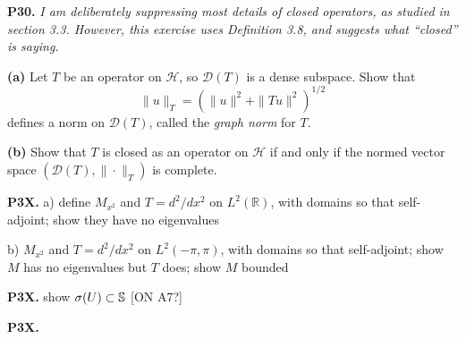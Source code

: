 \documentclass[12pt]{amsart}
\newcommand{\cD}{\mathcal{D}}
\newcommand{\cH}{\mathcal{H}}
\newcommand{\RR}{\mathbb{R}}
\newcommand{\prob}[1]{\bigskip\noindent\textbf{#1.}\quad }
\newcommand{\epart}[1]{\medskip\noindent\textbf{(#1)}\quad }
\begin{document}
\prob{P30} \emph{I am deliberately suppressing most details of \emph{closed} operators, as studied in section 3.3.  However, this exercise uses Definition 3.8, and suggests what ``closed'' is saying.}

\epart{a} Let $T$ be an operator on $\cH$, so $\cD(T)$ is a dense subspace.  Show that
	$$\|u\|_T = \left(\|u\|^2 + \|Tu\|^2\right)^{1/2}$$
defines a norm on $\cD(T)$, called the \emph{graph norm} for $T$.

\epart{b} Show that $T$ is closed as an operator on $\cH$ if and only if the normed vector space $(\cD(T),\|\cdot\|_T)$ is complete.


\prob{P3X}  a) define $M_{x^2}$ and $T=d^2/dx^2$ on $L^2(\RR)$, with domains so that self-adjoint; show they have no eigenvalues

b) $M_{x^2}$ and $T=d^2/dx^2$ on $L^2(-\pi,\pi)$, with domains so that self-adjoint; show $M$ has no eigenvalues but $T$ does; show $M$ bounded


\prob{P3X}  show $\sigma(U) \subset \mathbb{S}$  [ON A7?]

\prob{P3X} 
\end{document}
